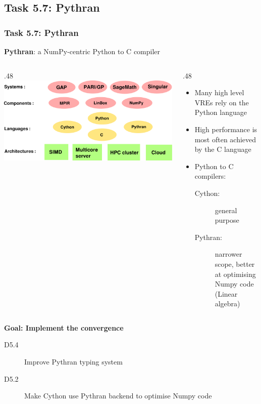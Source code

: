 \documentclass{beamer}
\begin{document}
\subsection{Task 5.7: Pythran}
\begin{frame}
  \frametitle{Task 5.7: Pythran}
  \begin{center}
    {\Large \textbf{Pythran}: a NumPy-centric Python to C compiler}
  \end{center}
  \begin{columns}
    \begin{column}
      {.48\textwidth }
          \includegraphics[width=\textwidth]{software_stack}
    \end{column}
    \begin{column}
      {.48\textwidth }
  \begin{itemize}
  \item Many high level VREs rely on the Python language
  \item High performance is most often achieved  by the C language\pause
  \item Python to C compilers: 
    \begin{description}
    \item[Cython:] general purpose
    \item[Pythran:] narrower scope, better at optimising Numpy code (Linear algebra)
    \end{description}
  \end{itemize}
    \end{column}
  \end{columns}
\pause
  \begin{center}
    \textbf{Goal: Implement the convergence}

    \begin{description}
      \item[D5.4] Improve Pythran typing system
      \item[D5.2] Make Cython use Pythran backend to optimise Numpy code
    \end{description}
  \end{center}

\end{frame}
\end{document}
